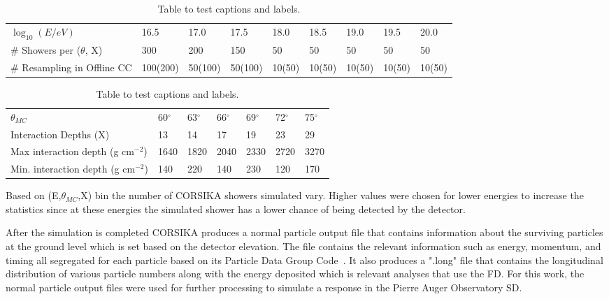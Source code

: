 \begin{table}[h!]
  \centering
  \begin{tabular}{ |p{4cm}||p{0.75cm}|p{0.75cm}|p{0.75cm}|p{0.75cm}|p{0.75cm}|p{0.75cm}|p{0.75cm}|p{0.75cm}|  }
    \hline
    $\log_{10}(E/eV)$& 16.5 &17.0 & 17.5 & 18.0 & 18.5 & 19.0 & 19.5 & 20.0 \\
    \# Showers per ($\theta$, X) & 300 & 200 & 150 & 50 & 50 & 50 & 50 & 50\\
    \# Resampling in Offline CC & 100(200) & 50(100) & 50(100) & 10(50) & 10(50) & 10(50) & 10(50) & 10(50)\\
    \hline
  \end{tabular}

    \bigskip
  \begin{tabular}{ |p{4cm}||p{0.75cm}|p{0.75cm}|p{0.75cm}|p{0.75cm}|p{0.75cm}|p{0.75cm}| }
    \hline
    $\theta_{MC}$  & 60$^\circ$& 63$^\circ$& 66$^\circ$& 69$^\circ$& 72$^\circ$ &75$^\circ$\\
    Interaction Depths (X) & 13    & 14 & 17 & 19 & 23 & 29\\
    Max interaction depth (g cm$^{-2}$) & 1640 & 1820 & 2040 & 2330 & 2720 & 3270\\
    Min. interaction depth (g cm$^{-2}$)& 140 & 220 & 140 & 230 & 120 & 170\\
    \hline
  \end{tabular}
  \caption{Table to test captions and labels.}
  \label{tab:Simulation_params}
\end{table}

Based on (E,$\theta_{MC}$,X) bin the number of CORSIKA showers simulated vary. Higher values were chosen for lower energies to increase the statistics since at these energies the simulated shower has a lower chance of being detected by the detector.  

After the simulation is completed CORSIKA produces a normal particle output file that contains information about the surviving particles at the ground level which is set based on the detector elevation. The file contains the relevant information such as energy, momentum, and timing all segregated for each particle based on its Particle Data Group Code~\cite{ParticleDataGroup:2024cfk}. It also produces a ".long" file that contains the longitudinal distribution of various particle numbers along with the energy deposited which is relevant analyses that use the FD. For this work, the normal particle output files were used for further processing to simulate a response in the Pierre Auger Observatory SD.


